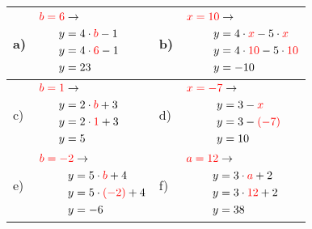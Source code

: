 \documentclass[12pt]{article}
\begin{document}
\begin{xltabular}{\textwidth}{|C{0.75cm}|X|C{0.75cm}|X|}
\hline
a)&$\begin{aligned}
\textcolor{red}{b=6} & \rightarrow\\
y&=4 \cdot \textcolor{red}{b} - 1\\
y&=4 \cdot \textcolor{red}{6} - 1\\
y&=23\\
\end{aligned}$
&
b)&$\begin{aligned}
\textcolor{red}{x=10} & \rightarrow\\
y&=4 \cdot \textcolor{red}{x} - 5 \cdot \textcolor{red}{x}\\
y&=4 \cdot \textcolor{red}{10} - 5 \cdot \textcolor{red}{10}\\
y&=-10\\
\end{aligned}$
\\\hline
c)&$\begin{aligned}
\textcolor{red}{b=1} & \rightarrow\\
y&=2 \cdot \textcolor{red}{b} + 3\\
y&=2 \cdot \textcolor{red}{1} + 3\\
y&=5\\
\end{aligned}$
&
d)&$\begin{aligned}
\textcolor{red}{x=-7} & \rightarrow\\
y&=3 - \textcolor{red}{x}\\
y&=3 - \textcolor{red}{(-7)}\\
y&=10\\
\end{aligned}$
\\\hline
e)&$\begin{aligned}
\textcolor{red}{b=-2} & \rightarrow\\
y&=5 \cdot \textcolor{red}{b} + 4\\
y&=5 \cdot \textcolor{red}{(-2)} + 4\\
y&=-6\\
\end{aligned}$
&
f)&$\begin{aligned}
\textcolor{red}{a=12} & \rightarrow\\
y&=3 \cdot \textcolor{red}{a} + 2\\
y&=3 \cdot \textcolor{red}{12} + 2\\
y&=38\\
\end{aligned}$

\end{xltabular}
\end{document}
